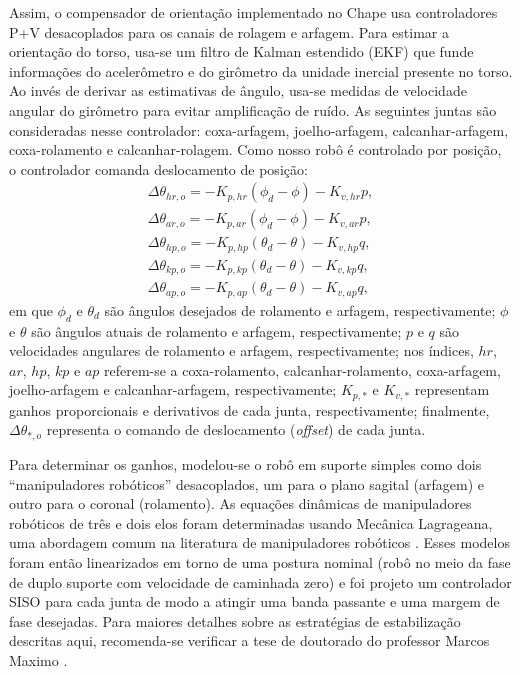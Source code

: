 Assim, o compensador de orientação implementado no Chape usa controladores P+V desacoplados para os canais de rolagem e arfagem. Para estimar a orientação do torso, usa-se um filtro de Kalman estendido (EKF) que funde informações do acelerômetro e do girômetro da unidade inercial presente no torso. Ao invés de derivar as estimativas de ângulo, usa-se medidas de velocidade angular do girômetro para evitar amplificação de ruído. As seguintes juntas são consideradas nesse controlador: coxa-arfagem, joelho-arfagem, calcanhar-arfagem, coxa-rolamento e calcanhar-rolagem. Como nosso robô é controlado por posição, o controlador comanda deslocamento de posição:
\begin{align}
\Delta \theta_{hr,o} = -K_{p,hr} \left( \phi_d - \phi \right) - K_{v,hr} p, \\
\Delta \theta_{ar,o} = -K_{p,ar} \left( \phi_d - \phi \right) - K_{v,ar} p, \\
\Delta \theta_{hp,o} = -K_{p,hp} \left( \theta_d - \theta \right) - K_{v,hp} q, \\
\Delta \theta_{kp,o} = -K_{p,kp} \left( \theta_d - \theta \right) - K_{v,kp} q, \\
\Delta \theta_{ap,o} = -K_{p,ap} \left( \theta_d - \theta \right) - K_{v,ap} q,
\end{align}
em que \( \phi_d \) e \( \theta_d \) são ângulos desejados de rolamento e arfagem, respectivamente; \( \phi \) e \( \theta \) são ângulos atuais de rolamento e arfagem, respectivamente; \( p \) e \( q \) são velocidades angulares de rolamento e arfagem, respectivamente; nos índices, \( hr \), \( ar \), \( hp \), \( kp \) e \( ap \) referem-se a coxa-rolamento, calcanhar-rolamento, coxa-arfagem, joelho-arfagem e calcanhar-arfagem, respectivamente; \( K_{p,*} \) e \( K_{v,*} \) representam ganhos proporcionais e derivativos de cada junta, respectivamente; finalmente, \( \Delta \theta_{*,o} \) representa o comando de deslocamento (\emph{offset}) de cada junta.

Para determinar os ganhos, modelou-se o robô em suporte simples como dois ``manipuladores robóticos'' desacoplados, um para o plano sagital (arfagem) e outro para o coronal (rolamento). As equações dinâmicas de manipuladores robóticos de três e dois elos foram determinadas usando Mecânica Lagrageana, uma abordagem comum na literatura de manipuladores robóticos \cite{craig1986}. Esses modelos foram então linearizados em torno de uma postura nominal (robô no meio da fase de duplo suporte com velocidade de caminhada zero) e foi projeto um controlador SISO para cada junta de modo a atingir uma banda passante e uma margem de fase desejadas. Para maiores detalhes sobre as estratégias de estabilização descritas aqui, recomenda-se verificar a tese de doutorado do professor Marcos Maximo \cite{tesemarcos}.

